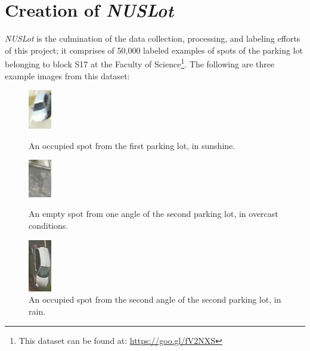 \documentclass[a4paper, 11pt]{article} %
\begin{document}
\section{Creation of \textit{NUSLot}}
	\textit{NUSLot} is the culmination of the data collection, processing, and labeling efforts of this 
	project; it comprises of 50,000 labeled examples of spots of the parking lot belonging to block 
	S17 at the Faculty of Science\footnote{This dataset can be found at: 
	\hyperlink{https://goo.gl/fV2NXS}{https://goo.gl/fV2NXS}}. The following are three example images 
	from this dataset:
	\vskip 5mm
	\begin{figure}[h]
		\centering
		\includegraphics[width=1cm]{figures/pklot_example_1.jpg}
		\caption{An occupied spot from the first parking lot, in sunshine.}
		\vspace{5mm}
		\includegraphics[width=1cm]{figures/pklot_example_2.jpg}
		\caption{An empty spot from one angle of the second parking lot, in overcast conditions.}
		\vspace{5mm}
		\includegraphics[width=1cm]{figures/pklot_example_3.jpg}
		\caption{An occupied spot from the second angle of the second parking lot, in rain.}
	\end{figure}
	\hspace*{-6mm}
\end{document}
